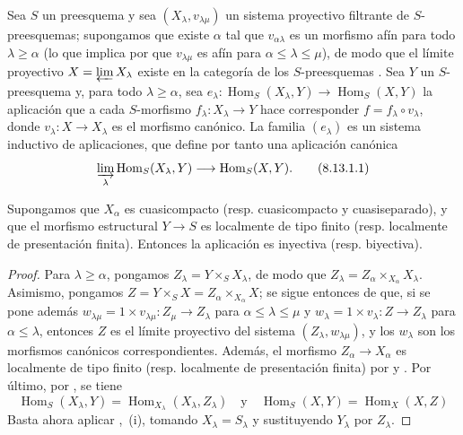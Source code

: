 \begin{proposition}[8.13.1]
\label{IV.8.13.1}
Sea $S$ un preesquema y sea $(X_\lambda,v_{\lambda\mu})$ un sistema proyectivo filtrante de $S$-preesquemas; supongamos que existe $\alpha$ tal que $v_{\alpha\lambda}$ es un morfismo afín para todo $\lambda\geqslant\alpha$ (lo que implica por  que $v_{\lambda\mu}$ es afín para $\alpha\leqslant\lambda\leqslant\mu$), de modo que el límite proyectivo $X=\varprojlim X_\lambda$ existe en la categoría de los $S$-preesquemas .
Sea $Y$ un $S$-preesquema y, para todo $\lambda\geqslant\alpha$, sea $e_\lambda:\operatorname{Hom}_S(X_\lambda,Y)\to\operatorname{Hom}_S(X,Y)$ la aplicación que a cada $S$-morfismo $f_\lambda:X_\lambda\to Y$ hace corresponder $f=f_\lambda\circ v_\lambda$, donde $v_\lambda:X\to X_\lambda$ es el morfismo canónico.
La familia $(e_\lambda)$ es un sistema inductivo de aplicaciones, que define por tanto una aplicación canónica
\begin{equation}
\label{IV.8.13.1.1}
\varinjlim_\lambda\operatorname{Hom}_S(X_\lambda,Y)\to\operatorname{Hom}_S(X,Y). \tag{8.13.1.1}
\end{equation}

Supongamos que $X_\alpha$ es cuasicompacto (resp. cuasicompacto y cuasiseparado), y que el morfismo estructural $Y\to S$ es localmente de tipo finito (resp. localmente de presentación finita).
Entonces la aplicación  es inyectiva (resp. biyectiva).
\end{proposition}

\begin{proof}
Para $\lambda\geqslant\alpha$, pongamos $Z_\lambda=Y\times_S X_\lambda$, de modo que $Z_\lambda=Z_\alpha\times_{X_\alpha}X_\lambda$.
Asimismo, pongamos $Z=Y\times_S X=Z_\alpha\times_{X_\alpha}X$; se sigue entonces de  que, si se pone además $w_{\lambda\mu}=1\times v_{\lambda\mu}:Z_\mu\to Z_\lambda$ para $\alpha\leqslant\lambda\leqslant\mu$ y $w_\lambda=1\times v_\lambda:Z\to Z_\lambda$ para $\alpha\leqslant\lambda$, entonces $Z$ es el límite proyectivo del sistema $(Z_\lambda,w_{\lambda\mu})$, y los $w_\lambda$ son los morfismos canónicos correspondientes.
Además, el morfismo $Z_\alpha\to X_\alpha$ es localmente de tipo finito (resp. localmente de presentación finita) por  y .
Por último, por , se tiene
\[
\operatorname{Hom}_S(X_\lambda,Y)=\operatorname{Hom}_{X_\lambda}(X_\lambda,Z_\lambda) \quad\text{y}\quad \operatorname{Hom}_S(X,Y)=\operatorname{Hom}_X(X,Z)
\]
Basta ahora aplicar ,~(i), tomando $X_\lambda=S_\lambda$ y sustituyendo $Y_\lambda$ por $Z_\lambda$.
\end{proof}

